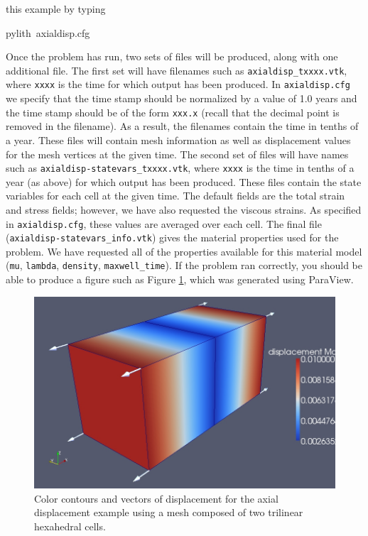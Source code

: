 this example by typing
\begin{lyxcode}
pylith~axialdisp.cfg
\end{lyxcode}
Once the problem has run, two sets of files will be produced, along
with one additional file. The first set will have filenames such as
\texttt{axialdisp\_txxxx.vtk}, where \texttt{xxxx} is the time for
which output has been produced. In \texttt{axialdisp.cfg} we specify
that the time stamp should be normalized by a value of 1.0 years and
the time stamp should be of the form \texttt{xxx.x} (recall that the
decimal point is removed in the filename). As a result, the filenames
contain the time in tenths of a year. These files will contain mesh
information as well as displacement values for the mesh vertices at
the given time. The second set of files will have names such as \texttt{axialdisp-statevars\_txxxx.vtk},
where \texttt{xxxx} is the time in tenths of a year (as above) for
which output has been produced. These files contain the state variables
for each cell at the given time. The default fields are the total
strain and stress fields; however, we have also requested the viscous
strains. As specified in \texttt{axialdisp.cfg}, these values are
averaged over each cell. The final file (\texttt{axialdisp-statevars\_info.vtk})
gives the material properties used for the problem. We have requested
all of the properties available for this material model (\texttt{mu},
\texttt{lambda}, \texttt{density}, \texttt{maxwell\_time}). If the
problem ran correctly, you should be able to produce a figure such
as Figure \ref{fig:twohex8-axial}, which was generated using ParaView.

\begin{figure}
\begin{centering}
\includegraphics[scale=0.33]{tutorials/twocells/figs/twohex8-axialdisp}
\par\end{centering}

\caption{Color contours and vectors of displacement for the axial displacement
example using a mesh composed of two trilinear hexahedral cells.\label{fig:twohex8-axial}}
\end{figure}



